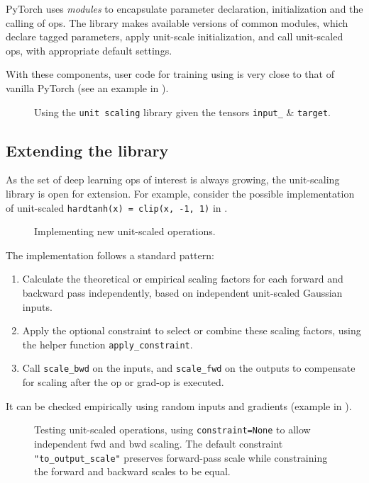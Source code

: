 PyTorch uses \emph{modules} to encapsulate parameter declaration, initialization and the calling of ops. The library makes available \umup{} versions of common modules, which declare tagged parameters, apply unit-scale initialization, and call unit-scaled ops, with appropriate default settings.

With these components, user code for training using \umup{} is very close to that of vanilla PyTorch (see an example in ).

\begin{figure}[h]
\caption{Using the \texttt{unit scaling} library given the tensors \texttt{input\_} \& \texttt{target}.}
\label{fig:umup_example}
\end{figure}

\subsection{Extending the library}

As the set of deep learning ops of interest is always growing, the unit-scaling library is open for extension. For example, consider the possible implementation of unit-scaled \texttt{hardtanh(x) = clip(x, -1, 1)} in .

\begin{figure}[h]
\caption{Implementing new unit-scaled operations.}
\label{fig:umup_extension_hardtanh}
\end{figure}

The implementation follows a standard pattern:

\begin{enumerate}
\item Calculate the theoretical or empirical scaling factors for each forward and backward pass independently, based on independent unit-scaled Gaussian inputs.
\item Apply the optional constraint to select or combine these scaling factors, using the helper function \texttt{apply\_constraint}.
\item Call \texttt{scale\_bwd} on the inputs, and \texttt{scale\_fwd} on the outputs to compensate for scaling after the op or grad-op is executed.
\end{enumerate}

It can be checked empirically using random inputs and gradients (example in ).

\begin{figure}[h]
\caption{Testing unit-scaled operations, using \texttt{constraint=None} to allow independent fwd and bwd scaling. The default constraint \texttt{"to\_output\_scale"} preserves forward-pass scale while constraining the forward and backward scales to be equal.}
\label{fig:umup_testing_hardtanh}
\end{figure}


